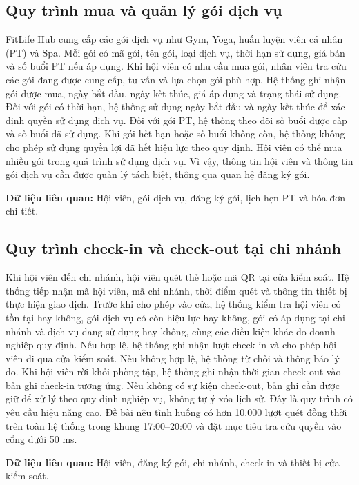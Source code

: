 \documentclass[11pt, a4paper]{article}
\begin{document}
\subsection{Quy trình mua và quản lý gói dịch vụ}
FitLife Hub cung cấp các gói dịch vụ như Gym, Yoga, huấn luyện viên cá nhân (PT) và Spa. Mỗi gói có mã gói, tên gói, loại dịch vụ, thời hạn sử dụng, giá bán và số buổi PT nếu áp dụng. Khi hội viên có nhu cầu mua gói, nhân viên tra cứu các gói đang được cung cấp, tư vấn và lựa chọn gói phù hợp. Hệ thống ghi nhận gói được mua, ngày bắt đầu, ngày kết thúc, giá áp dụng và trạng thái sử dụng. Đối với gói có thời hạn, hệ thống sử dụng ngày bắt đầu và ngày kết thúc để xác định quyền sử dụng dịch vụ. Đối với gói PT, hệ thống theo dõi số buổi được cấp và số buổi đã sử dụng. Khi gói hết hạn hoặc số buổi không còn, hệ thống không cho phép sử dụng quyền lợi đã hết hiệu lực theo quy định. Hội viên có thể mua nhiều gói trong quá trình sử dụng dịch vụ. Vì vậy, thông tin hội viên và thông tin gói dịch vụ cần được quản lý tách biệt, thông qua quan hệ đăng ký gói.

\textbf{Dữ liệu liên quan:} Hội viên, gói dịch vụ, đăng ký gói, lịch hẹn PT và hóa đơn chi tiết.

\subsection{Quy trình check-in và check-out tại chi nhánh}
Khi hội viên đến chi nhánh, hội viên quét thẻ hoặc mã QR tại cửa kiểm soát. Hệ thống tiếp nhận mã hội viên, mã chi nhánh, thời điểm quét và thông tin thiết bị thực hiện giao dịch. Trước khi cho phép vào cửa, hệ thống kiểm tra hội viên có tồn tại hay không, gói dịch vụ có còn hiệu lực hay không, gói có áp dụng tại chi nhánh và dịch vụ đang sử dụng hay không, cùng các điều kiện khác do doanh nghiệp quy định. Nếu hợp lệ, hệ thống ghi nhận lượt check-in và cho phép hội viên đi qua cửa kiểm soát. Nếu không hợp lệ, hệ thống từ chối và thông báo lý do. Khi hội viên rời khỏi phòng tập, hệ thống ghi nhận thời gian check-out vào bản ghi check-in tương ứng. Nếu không có sự kiện check-out, bản ghi cần được giữ để xử lý theo quy định nghiệp vụ, không tự ý xóa lịch sử. Đây là quy trình có yêu cầu hiệu năng cao. Đề bài nêu tình huống có hơn 10.000 lượt quét đồng thời trên toàn hệ thống trong khung 17:00--20:00 và đặt mục tiêu tra cứu quyền vào cổng dưới 50 ms.

\textbf{Dữ liệu liên quan:} Hội viên, đăng ký gói, chi nhánh, check-in và thiết bị cửa kiểm soát.
\end{document}
